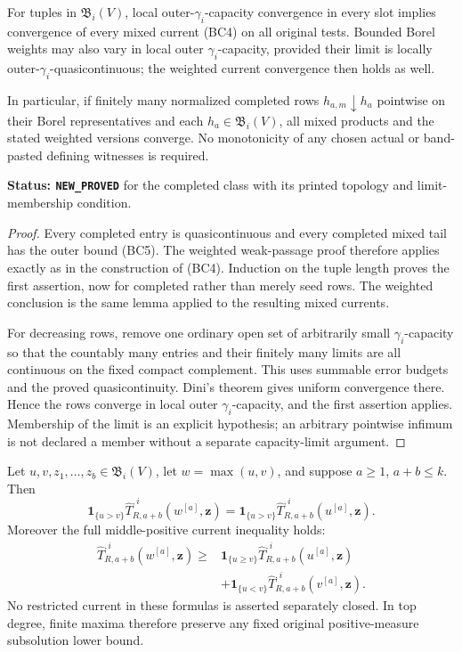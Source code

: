 \begin{theorem}
\label{thm:r12-completed-band-continuity}
For tuples in $\mathfrak B_i(V)$, local outer-$\gamma_i$-capacity
convergence in every slot implies convergence of every mixed
current (BC4) on all original tests. Bounded Borel weights may
also vary in local outer $\gamma_i$-capacity, provided their
limit is locally outer-$\gamma_i$-quasicontinuous; the weighted
current convergence then holds as well.

In particular, if finitely many normalized completed rows
$h_{a,m}\downarrow h_a$ pointwise on their Borel representatives
and each $h_a\in\mathfrak B_i(V)$, all mixed products and
the stated weighted versions converge. No monotonicity of any
chosen actual or band-pasted defining witnesses is required.
\end{theorem}

\noindent\textbf{Status: \texttt{NEW\_PROVED}} for the completed
class with its printed topology and limit-membership condition.

\begin{proof}
Every completed entry is quasicontinuous and every completed
mixed tail has the outer bound (BC5). The weighted weak-passage
proof therefore applies exactly as in the construction of (BC4).
Induction on the tuple length proves the first assertion, now
for completed rather than merely seed rows. The weighted
conclusion is the same lemma applied to the resulting mixed
currents.

For decreasing rows, remove one ordinary open set of arbitrarily
small $\gamma_i$-capacity so that the countably many entries
and their finitely many limits are all continuous on the fixed
compact complement. This uses summable error budgets and the
proved quasicontinuity. Dini's theorem gives uniform convergence
there. Hence the rows converge in local outer $\gamma_i$-capacity,
and the first assertion applies. Membership of the limit is an
explicit hypothesis; an arbitrary pointwise infimum is not
declared a member without a separate capacity-limit argument.
\end{proof}

\begin{theorem}
\label{thm:r12-completed-band-maximum-carriers}
Let $u,v,z_1,\ldots,z_b\in\mathfrak B_i(V)$, let
$w=\max(u,v)$, and suppose $a\geq1$, $a+b\leq k$. Then
\[
 \mathbf1_{\{u>v\}}\widehat T^{,i}_{R,a+b}(w^{[a]},\mathbf z)
    =\mathbf1_{\{u>v\}}\widehat T^{,i}_{R,a+b}(u^{[a]},\mathbf z).
 \tag{BC8}
\]
Moreover the full middle-positive current inequality holds:
\[
 \begin{split}
 \widehat T^{,i}_{R,a+b}(w^{[a]},\mathbf z)
 \geq{}&\mathbf1_{\{u\geq v\}}
                    \widehat T^{,i}_{R,a+b}(u^{[a]},\mathbf z)\\
       &+\mathbf1_{\{u<v\}}
                    \widehat T^{,i}_{R,a+b}(v^{[a]},\mathbf z).
 \end{split}
 \tag{BC9}
\]
No restricted current in these formulas is asserted separately
closed. In top degree, finite maxima therefore preserve any
fixed original positive-measure subsolution lower bound.
\end{theorem}

